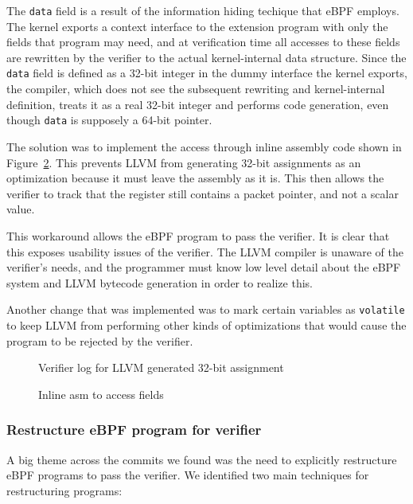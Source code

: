 The \texttt{data} field is a result of the information hiding techique that
    eBPF employs.
The kernel exports a context interface to the extension program with only
    the fields that program may need, and at verification time all accesses to
    these fields are rewritten by the verifier to the actual kernel-internal
    data structure.
Since the \texttt{data} field is defined as a 32-bit integer in the dummy
    interface the kernel exports, the compiler, which does not see the
    subsequent rewriting and kernel-internal definition, treats it as a real
    32-bit integer and performs code generation, even though \texttt{data} is
    supposely a 64-bit pointer.

The solution was to implement the access through inline assembly code shown in Figure~\ref{fig:inline-asm}.
This prevents LLVM from generating 32-bit assignments as an optimization because it must leave the assembly as it is.
This then allows the verifier to track that the register still contains a packet pointer, and not a scalar value.


This workaround allows the eBPF program to pass the verifier.
It is clear that this exposes usability issues of the verifier.
The LLVM compiler is unaware of the verifier's needs, and the programmer must know low level detail about the eBPF system and LLVM bytecode generation in order to realize this.

Another change that was implemented was to mark certain variables as \texttt{volatile}
to keep LLVM from performing other kinds of optimizations that would cause the program to be rejected by the verifier.

\begin{figure}
    
    \caption{Verifier log for LLVM generated 32-bit assignment}
    \label{fig:inline-error}
\end{figure}

\begin{figure}
    
    \caption{Inline asm to access fields}
    \label{fig:inline-asm}
\end{figure}


\subsubsection{Restructure eBPF program for verifier}
\label{motivation:restructure}
A big theme across the commits we found was the need to explicitly restructure eBPF programs to pass the verifier.
We identified two main techniques for restructuring programs:

